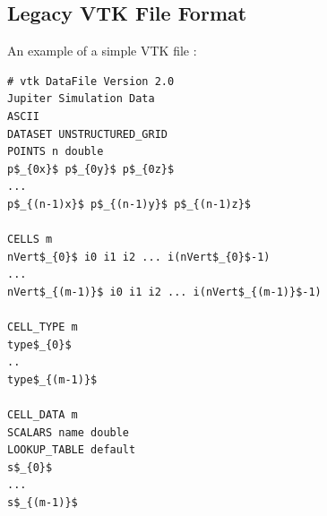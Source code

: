 \documentclass[preprint2]{aastex62}
\begin{document}
\begin{appendix}
\section{Legacy VTK File Format}
An example of a simple VTK file \cite{Formats2009}:
\begin{lstlisting}
# vtk DataFile Version 2.0
Jupiter Simulation Data
ASCII
DATASET UNSTRUCTURED_GRID
POINTS n double
p$_{0x}$ p$_{0y}$ p$_{0z}$
...
p$_{(n-1)x}$ p$_{(n-1)y}$ p$_{(n-1)z}$

CELLS m 
nVert$_{0}$ i0 i1 i2 ... i(nVert$_{0}$-1)
...
nVert$_{(m-1)}$ i0 i1 i2 ... i(nVert$_{(m-1)}$-1)

CELL_TYPE m 
type$_{0}$
..
type$_{(m-1)}$

CELL_DATA m
SCALARS name double
LOOKUP_TABLE default
s$_{0}$
...
s$_{(m-1)}$
\end{lstlisting}
\end{appendix}

\end{document}
